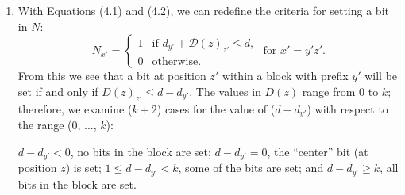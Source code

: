\documentclass[oneside,12pt]{DISCSthesis}
\begin{document}
{\begin{enumerate}
			\item With Equations (4.1) and (4.2), we can redefine the criteria for setting a bit in $N$:
				\begin{equation}
					N_{x'} = \left\{
					\begin{array}{rl}
						1 & \text{if } d_{y'} + \mathcal{D}(z)_{z'} \leq d,\\
						0 & \text{otherwise.}%
					\end{array} \right.
					\text{ for }x' = y'z'.
					\end{equation}
				From this we see that a bit at position $z'$ within a block with prefix $y'$ will be set if and only if $D(z)_{z'} \leq d-d_{y'}$. The values in $D(z)$ range from 0 to $k$; therefore, we examine ($k + 2$) cases for the value of ($d - d_{y'}$) with respect to the range (0, ..., $k$):

					{\small
					\hspace*{40pt}{\bf\boldmath Case $-1$:}
					\hspace*{54pt} $d-d_{y'} < 0$, \hspace*{24pt}no bits in the block are set;\newline
					\hspace*{40pt}{\bf\boldmath Case 0:}
					\hspace*{66pt} $d-d_{y'} = 0$, \hspace*{24pt}the ``center'' bit (at position $z$) is set;\newline
					\hspace*{40pt}{\bf\boldmath\boldmath Cases 1 to $k-1$:}
					\hspace*{11.5pt} $1 \leq d-d_{y'} < k$, \hspace*{5pt}some of the bits are set; and\newline
					\hspace*{40pt}{\bf\boldmath Case $k$:}
					\hspace*{66pt}$d-d_{y'} \geq k$, \hspace*{24pt}all bits in the block are set.}


\end{enumerate}}
\end{document}
